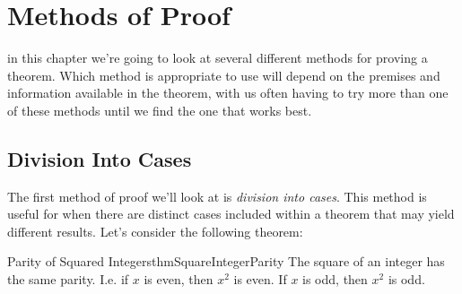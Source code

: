 \chapter{Methods of Proof}

in this chapter we're going to look at several different methods for proving a theorem. Which method is appropriate to use will depend on the premises and information available in the theorem, with us often having to try more than one of these methods until we find the one that works best.

\section{Division Into Cases}
The first method of proof we'll look at is \emph{division into cases}. This method is useful for when there are distinct cases included within a theorem that may yield different results. Let's consider the following theorem:

\begin{theorem}[label={theorem:SquareIntegerParity}]{Parity of Squared Integers}{thmSquareIntegerParity}
    The square of an integer has the same parity. I.e. if $x$ is even, then $x^2$ is even. If $x$ is odd, then $x^2$ is odd.
\end{theorem}

